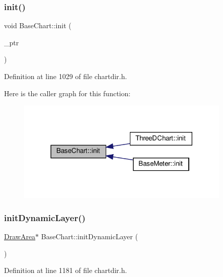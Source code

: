 \subsubsection{\texorpdfstring{init()}{init()}}
{\footnotesize\ttfamily void Base\+Chart\+::init (\begin{DoxyParamCaption}\item[{Base\+Chart\+Internal $\ast$}]{\+\_\+ptr }\end{DoxyParamCaption})\hspace{0.3cm}{\ttfamily [inline]}}



Definition at line 1029 of file chartdir.\+h.

Here is the caller graph for this function\+:
\nopagebreak
\begin{figure}[H]
\begin{center}
\leavevmode
\includegraphics[width=290pt]{class_base_chart_a583eeb7a216ad16fb331f419649fb0e8_icgraph}
\end{center}
\end{figure}
\mbox{\label{class_base_chart_acef63841f659fbacdad0b1a63997a89c}} 
\subsubsection{\texorpdfstring{init\+Dynamic\+Layer()}{initDynamicLayer()}}
{\footnotesize\ttfamily \hyperlink{class_draw_area}{Draw\+Area}$\ast$ Base\+Chart\+::init\+Dynamic\+Layer (\begin{DoxyParamCaption}{ }\end{DoxyParamCaption})\hspace{0.3cm}{\ttfamily [inline]}}



Definition at line 1181 of file chartdir.\+h.

